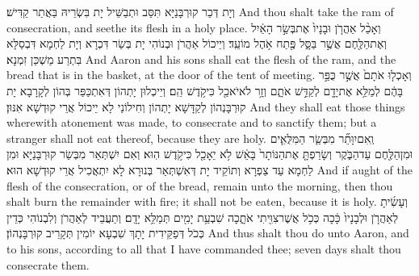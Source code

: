 {וְיָת דְּכַר קוּרְבָּנַיָּא תִּסַּב וּתְבַשֵּׁיל יָת בִּשְׂרֵיהּ בַּאֲתַר קַדִּישׁ׃}
{And thou shalt take the ram of consecration, and seethe its flesh in a holy place.}{}
{וְאָכַ֨ל אַהֲרֹ֤ן וּבָנָיו֙ אֶת\maqqaf בְּשַׂ֣ר הָאַ֔יִל וְאֶת\maqqaf הַלֶּ֖חֶם אֲשֶׁ֣ר בַּסָּ֑ל פֶּ֖תַח אֹ֥הֶל מוֹעֵֽד׃}
{וְיֵיכוֹל אַהֲרֹן וּבְנוֹהִי יָת בְּשַׂר דִּכְרָא וְיָת לַחְמָא דִּבְסַלָּא בִּתְרַע מַשְׁכַּן זִמְנָא׃}
{And Aaron and his sons shall eat the flesh of the ram, and the bread that is in the basket, at the door of the tent of meeting.}{}
{וְאָכְל֤וּ אֹתָם֙ אֲשֶׁ֣ר כֻּפַּ֣ר בָּהֶ֔ם לְמַלֵּ֥א אֶת\maqqaf יָדָ֖ם לְקַדֵּ֣שׁ אֹתָ֑ם וְזָ֥ר לֹא\maqqaf יֹאכַ֖ל כִּי\maqqaf קֹ֥דֶשׁ הֵֽם׃}
{וְיֵיכְלוּן יָתְהוֹן דְּאִתְכַּפַּר בְּהוֹן לְקָרָבָא יָת קוּרְבָּנְהוֹן לְקַדָּשָׁא יָתְהוֹן וְחִילוֹנַי לָא יֵיכוֹל אֲרֵי קוּדְשָׁא אִנּוּן׃}
{And they shall eat those things wherewith atonement was made, to consecrate and to sanctify them; but a stranger shall not eat thereof, because they are holy.}{}
{וְֽאִם\maqqaf יִוָּתֵ֞ר מִבְּשַׂ֧ר הַמִּלֻּאִ֛ים וּמִן\maqqaf הַלֶּ֖חֶם עַד\maqqaf הַבֹּ֑קֶר וְשָׂרַפְתָּ֤ אֶת\maqqaf הַנּוֹתָר֙ בָּאֵ֔שׁ לֹ֥א יֵאָכֵ֖ל כִּי\maqqaf קֹ֥דֶשׁ הֽוּא׃}
{וְאִם יִשְׁתְּאַר מִבְּשַׂר קוּרְבָּנַיָּא וּמִן לַחְמָא עַד צַפְרָא וְתוֹקֵיד יָת דְּאִשְׁתְּאַר בְּנוּרָא לָא יִתְאֲכִיל אֲרֵי קוּדְשָׁא הוּא׃}
{And if aught of the flesh of the consecration, or of the bread, remain unto the morning, then thou shalt burn the remainder with fire; it shall not be eaten, because it is holy.}{}
{וְעָשִׂ֜יתָ לְאַהֲרֹ֤ן וּלְבָנָיו֙ כָּ֔כָה כְּכֹ֥ל אֲשֶׁר\maqqaf צִוִּ֖יתִי אֹתָ֑כָה שִׁבְעַ֥ת יָמִ֖ים תְּמַלֵּ֥א יָדָֽם׃}
{וְתַעֲבֵיד לְאַהֲרֹן וְלִבְנוֹהִי כְּדֵין כְּכֹל דְּפַקֵּידִית יָתָךְ שִׁבְעָא יוֹמִין תְּקָרֵיב קוּרְבָּנְהוֹן׃}
{And thus shalt thou do unto Aaron, and to his sons, according to all that I have commanded thee; seven days shalt thou consecrate them.}{}
